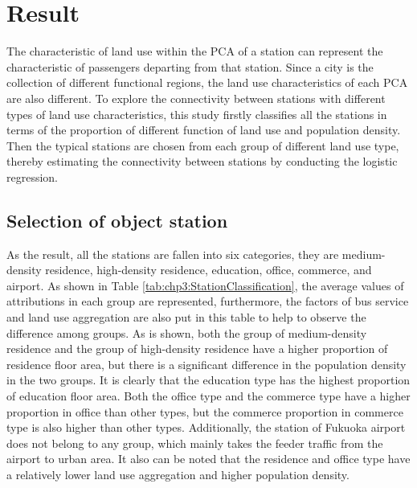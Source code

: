 \section{Result}
%
The characteristic of land use within the PCA of a station can represent the characteristic of passengers departing from that station. Since a city is the collection of different functional regions, the land use characteristics of each PCA are also different. To explore the connectivity between stations with different types of land use characteristics, this study firstly classifies all the stations in terms of the proportion of different function of land use and population density. Then the typical stations are chosen from each group of different land use type, thereby estimating the connectivity between stations by conducting the logistic regression. 

\subsection{Selection of object station}
%
As the result, all the stations are fallen into six categories, they are medium-density residence, high-density residence, education, office, commerce, and airport. As shown in Table \ref{tab:chp3:StationClassification}, the average values of attributions in each group are represented, furthermore, the factors of bus service and land use aggregation are also put in this table to help to observe the difference among groups. As is shown, both the group of medium-density residence and the group of high-density residence have a higher proportion of residence floor area, but there is a significant difference in the population density in the two groups. It is clearly that the education type has the highest proportion of education floor area. Both the office type and the commerce type have a higher proportion in office than other types, but the commerce proportion in commerce type is also higher than other types. Additionally, the station of Fukuoka airport does not belong to any group, which mainly takes the feeder traffic from the airport to urban area. It also can be noted that the residence and office type have a relatively lower land use aggregation and higher population density.

